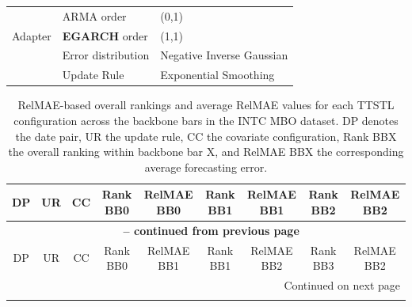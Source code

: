 \documentclass[10pt,a4paper,oneside]{article}
\begin{document}
\begin{longtable}{@{}lll@{}}
\multirow{3}{*}{Adapter} 
 & ARMA order & (0,1) \\
 & \textbf{EGARCH} order & (1,1) \\
 & Error distribution & Negative Inverse Gaussian \\ 
 & Update Rule & Exponential Smoothing \\
\end{longtable}


\begingroup
\small %
\setlength{\tabcolsep}{3pt} %
\begin{longtable}{@{}ccccccccc@{}}

\caption{RelMAE-based overall rankings and average RelMAE values for each TTSTL configuration across the backbone bars in the INTC MBO dataset. DP denotes the date pair, UR the update rule, CC the covariate configuration, Rank BBX the overall ranking within backbone bar X, and RelMAE BBX the corresponding average forecasting error.} 
\label{tab:intc_data_results} \\

\toprule
DP & UR & CC & Rank BB0 & RelMAE BB0 & Rank BB1 & RelMAE BB1 & Rank BB2 & RelMAE BB2 \\
\midrule
\endfirsthead

\multicolumn{9}{c}{{\bfseries \tablename\ \thetable{} -- continued from previous page}} \\
\toprule
DP & UR & CC & Rank BB0 & RelMAE BB1 & Rank BB1 & RelMAE BB2 & Rank BB3 & RelMAE BB2 \\
\midrule
\endhead

\midrule
\multicolumn{9}{r}{{Continued on next page}} \\
\bottomrule
\endfoot

\bottomrule
\endlastfoot


\end{longtable}
\end{document}
